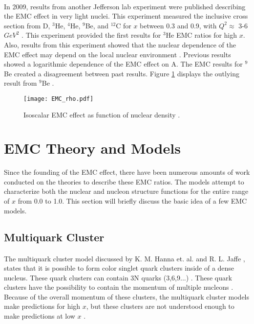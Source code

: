 \paragraph{}In 2009, results from another Jefferson lab experiment were published describing the EMC effect in very light nuclei. This experiment measured the inclusive cross section from D, $^3$He, $^4$He, $^9$Be, and $^{12}$C for $x$ between 0.3 and 0.9, with $Q^2 \approx$ 3-6 $GeV^2$ \cite{seeley}.  This experiment provided the first results for $^3$He EMC ratios for high $x$.  Also, results from this experiment showed that the nuclear dependence of the EMC effect may depend on the local nuclear environment \cite{seeley}. Previous results showed a logarithmic dependence of the EMC effect on A. The EMC results for $^9$Be created a disagreement between past results. Figure \ref{EMCrho}  displays the outlying result from $^9$Be \cite{seeley}.

\iffalse
\begin{figure}[h]
	\centering
	\texttt{[image: He3\_EMC\_seely.pdf]} 
	\caption{EMC ratio for He3, Blue points are corrected for proton excess\cite{seeley}.}
	\label{EMCHe3_Seely}
\end{figure} 
\fi

\begin{figure}[t]
	\centering
	\texttt{[image: EMC\_rho.pdf]} 
	\caption{Isoscalar EMC effect as function of nuclear density \cite{seeley}.}
	\label{EMCrho}
\end{figure} 

\section{EMC Theory and Models}
\paragraph{}Since the founding of the EMC effect, there have been numerous amounts of work conducted on the theories to describe these EMC ratios. The models attempt to characterize both the nuclear and nucleon structure functions for the entire range of $x$ from 0.0 to 1.0. This section will briefly discuss the basic idea of a few EMC models.
\subsection{Multiquark Cluster}
\paragraph{} The multiquark cluster model discussed by K. M. Hanna et. al. \cite{EMC_multiQ} and R. L. Jaffe \cite{EMC_multiQ_2}, states that it is possible to form color singlet quark clusters inside of a dense nucleus. These quark clusters can contain 3N quarks (3,6,9...) \cite{Norton}. These quark clusters have the possibility to contain the momentum of multiple nucleons \cite{Ajth}. Because of the overall momentum of these clusters, the multiquark cluster models make predictions for high $x $, but these clusters are not understood enough to make predictions at low $x$ \cite{ EMC_model_1,Geesaman,  Ajth,EMC_multiQ}.  

